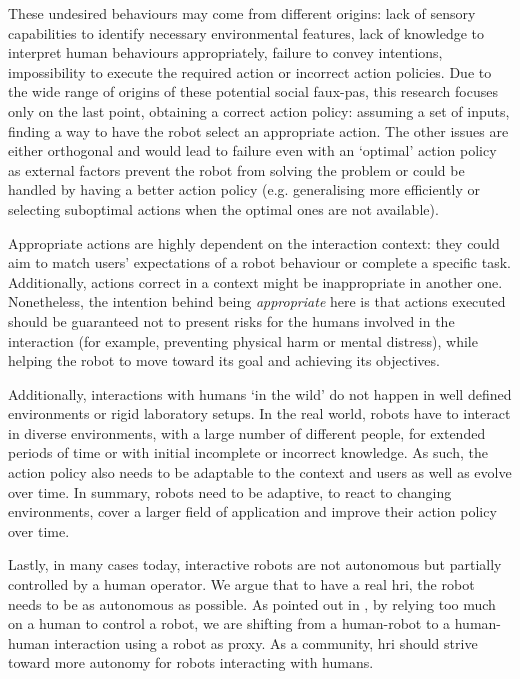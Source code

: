     These undesired behaviours may come from different origins: lack of sensory capabilities to identify necessary environmental features, lack of knowledge to interpret human behaviours appropriately, failure to convey intentions, impossibility to execute the required action or incorrect action policies. Due to the wide range of origins of these potential social faux-pas, this research focuses only on the last point, obtaining a correct action policy: assuming a set of inputs, finding a way to have the robot select an appropriate action. The other issues are either orthogonal and would lead to failure even with an `optimal' action policy as external factors prevent the robot from solving the problem or could be handled by having a better action policy (e.g. generalising more efficiently or selecting suboptimal actions when the optimal ones are not available).%
    
    Appropriate actions are highly dependent on the interaction context: they could aim to match users' expectations of a robot behaviour or complete a specific task. Additionally, actions correct in a context might be inappropriate in another one. Nonetheless, the intention behind being \textit{appropriate} here is that actions executed should be guaranteed not to present risks for the humans involved in the interaction (for example, preventing physical harm or mental distress), while helping the robot to move toward its goal and achieving its objectives.

    Additionally, interactions with humans `in the wild' \citep{belpaeme2012multimodal} do not happen in well defined environments or rigid laboratory setups. In the real world, robots have to interact in diverse environments, with a large number of different people, for extended periods of time or with initial incomplete or incorrect knowledge. As such, the action policy also needs to be adaptable to the context and users as well as evolve over time. In summary, robots need to be adaptive, to react to changing environments, cover a larger field of application and improve their action policy over time.

    Lastly, in many cases today, interactive robots are not autonomous but partially controlled by a human operator. We argue that to have a real \gls{hri}, the robot needs to be as autonomous as possible. As pointed out in \citet{baxter2016characterising}, by relying too much on a human to control a robot, we are shifting from a human-robot to a human-human interaction using a robot as proxy. As a community, \gls{hri} should strive toward more autonomy for robots interacting with humans.
    
